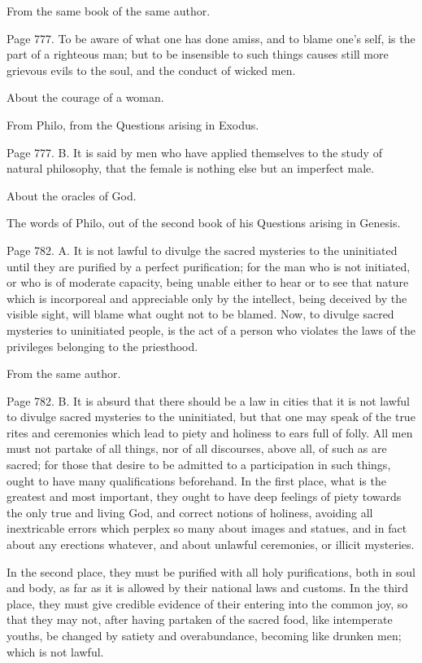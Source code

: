 From the same book of the same author.

Page 777. To be aware of what one has done amiss, and to blame one's self, is the part of a
righteous man; but to be insensible to such things causes still more grievous evils to the soul, and
the conduct of wicked men.

About the courage of a woman.

From Philo, from the Questions arising in Exodus.

Page 777. B. It is said by men who have applied themselves to the study of natural philosophy, that
the female is nothing else but an imperfect male.

About the oracles of God.

The words of Philo, out of the second book of his Questions arising in Genesis.

Page 782. A. It is not lawful to divulge the sacred mysteries to the uninitiated until they are purified
by a perfect purification; for the man who is not initiated, or who is of moderate capacity, being
unable either to hear or to see that nature which is incorporeal and appreciable only by the intellect,
being deceived by the visible sight, will blame what ought not to be blamed. Now, to divulge sacred
mysteries to uninitiated people, is the act of a person who violates the laws of the privileges
belonging to the priesthood.

From the same author.

Page 782. B. It is absurd that there should be a law in cities that it is not lawful to divulge sacred
mysteries to the uninitiated, but that one may speak of the true rites and ceremonies which lead to
piety and holiness to ears full of folly. All men must not partake of all things, nor of all discourses,
above all, of such as are sacred; for those that desire to be admitted to a participation in such
things, ought to have many qualifications beforehand. In the first place, what is the greatest and
most important, they ought to have deep feelings of piety towards the only true and living God, and
correct notions of holiness, avoiding all inextricable errors which perplex so many about images
and statues, and in fact about any erections whatever, and about unlawful ceremonies, or illicit
mysteries.

In the second place, they must be purified with all holy purifications, both in soul and body, as far as
it is allowed by their national laws and customs. In the third place, they must give credible evidence
of their entering into the common joy, so that they may not, after having partaken of the sacred
food, like intemperate youths, be changed by satiety and overabundance, becoming like drunken
men; which is not lawful.

